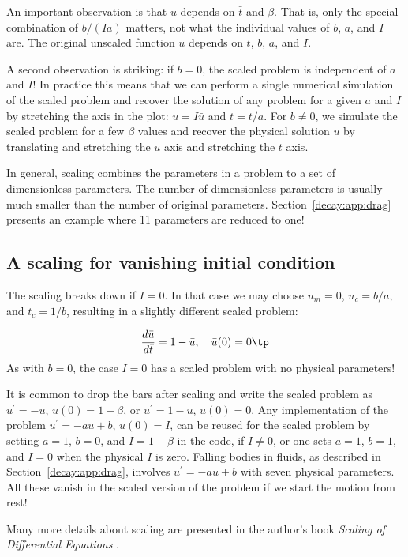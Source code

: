 \documentclass[graybox,sectrefs,envcountresetchap,open=right,final]{svmonodo}
\begin{document}
An important observation is that $\bar u$ depends on $\bar t$
and $\beta$.
That is, only the special combination of $b/(Ia)$ matters, not what
the individual values of $b$, $a$, and $I$ are. The original unscaled
function $u$ depends on $t$, $b$, $a$, and $I$.

A second observation is striking: if $b=0$, the scaled problem is
independent of $a$ and $I$! In practice this means that we can perform
a single numerical simulation of the scaled problem and recover the
solution of any problem for a given $a$ and $I$ by stretching the axis
in the plot: $u=I\bar u$ and $t =\bar t/a$.  For $b\neq 0$, we
simulate the scaled problem for a few $\beta$ values and recover the
physical solution $u$ by translating and stretching the $u$ axis and
stretching the $t$ axis.

In general, scaling combines the parameters in a problem to a set
of dimensionless parameters. The number of dimensionless parameters is
usually much smaller than the number of original parameters.
Section~\ref{decay:app:drag} presents an example where 11 parameters
are reduced to one!

\subsection{A scaling for vanishing initial condition}

The scaling breaks down if $I=0$. In that case we may choose $u_m=0$,
$u_c=b/a$, and $t_c=1/b$, resulting in a slightly different scaled problem:

\[ \frac{d\bar u}{d\bar t} = 1 -\bar u,\quad \bar u(0)=0\tp\]
As with $b=0$, the case $I=0$ has a scaled problem with no physical
parameters!

It is common to drop the bars after scaling and write the scaled
problem as $u^{\prime}=-u$, $u(0)=1-\beta$, or $u^{\prime}=1-u$, $u(0)=0$.
Any implementation of the problem $u^{\prime}=-au+b$, $u(0)=I$, can be
reused for the scaled problem by setting $a=1$, $b=0$, and $I=1-\beta$
in the code, if $I\neq 0$, or one sets
$a=1$, $b=1$, and $I=0$ when the physical $I$ is zero.
Falling bodies in fluids, as described in Section~\ref{decay:app:drag},
involves $u^{\prime}=-au+b$ with seven physical parameters. All these vanish
in the scaled version of the problem if we start the motion from rest!

Many more details about scaling are presented in the author's book
\emph{Scaling of Differential Equations} \cite{Langtangen_scaling}.
\end{document}
